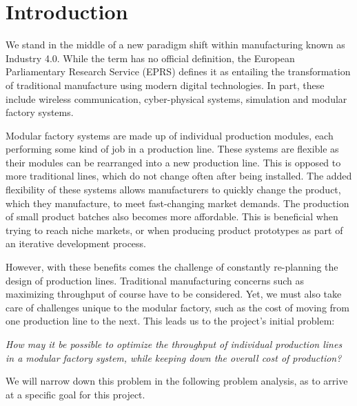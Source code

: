 \chapter{Introduction}
\label{ch:introduction}
We stand in the middle of a new paradigm shift within manufacturing known as Industry 4.0. While the term has no official definition, the European Parliamentary Research Service (EPRS)\cite{Davis2015} defines it as entailing the transformation of traditional manufacture using modern digital technologies. In part, these include wireless communication, cyber-physical systems, simulation and modular factory systems.

Modular factory systems are made up of individual production modules, each performing some kind of job in a production line. These systems are flexible as their modules can be rearranged into a new production line. This is opposed to more traditional lines, which do not change often after being installed. The added flexibility of these systems allows manufacturers to quickly change the product, which they manufacture, to meet fast-changing market demands. The production of small product batches also becomes more affordable. This is beneficial when trying to reach niche markets, or when producing product prototypes as part of an iterative development process.

However, with these benefits comes the challenge of constantly re-planning the design of production lines. Traditional manufacturing concerns such as maximizing throughput of course have to be considered. Yet, we must also take care of challenges unique to the modular factory, such as the cost of moving from one production line to the next. This leads us to the project's initial problem:

\bigskip
\textit{How may it be possible to optimize the throughput of individual production lines in a modular factory system, while keeping down the overall cost of production?}
\bigskip

We will narrow down this problem in the following problem analysis, as to arrive at a specific goal for this project. 

